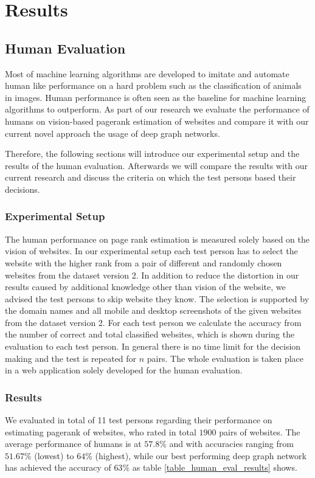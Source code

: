 \section{Results}

\subsection{Human Evaluation}
Most of machine learning algorithms are developed to imitate and automate human like performance on a hard problem such as the classification of animals in images. Human performance is often seen as the baseline for machine learning algorithms to outperform. As part of our research we evaluate the performance of humans on vision-based pagerank estimation of websites and compare it with our current novel approach the usage of deep graph networks. 

Therefore, the following sections will introduce our experimental setup and the results of the human evaluation. Afterwards we will compare the results with our current research and discuss the criteria on which the test persons based their decisions.

\subsubsection{Experimental Setup} 
The human performance on page rank estimation is measured solely based on the vision of websites. In our experimental setup each test person has to select the website with the higher rank from a pair of different and randomly chosen websites from the dataset version 2. In addition to reduce the distortion in our results caused by additional knowledge other than vision of the website, we advised the test persons to skip website they know. The selection is supported by the domain names and all mobile and desktop screenshots of the given websites from the dataset version 2. For each test person we calculate the accuracy from the number of correct and total classified websites, which is shown during the evaluation to each test person. In general there is no time limit for the decision making and the test is repeated for $n$ pairs. The whole evaluation is taken place in a web application solely developed for the human evaluation.

\subsubsection{Results}
We evaluated in total of 11 test persons regarding their performance on estimating pagerank of websites, who rated in total $1900$ pairs of websites. The average performance of humans is at $57.8$\% and with accuracies ranging from $51.67$\% (lowest) to $64$\% (highest), while our best performing deep graph network has achieved the accuracy of $63$\% as table \ref{table_human_eval_results} shows.

